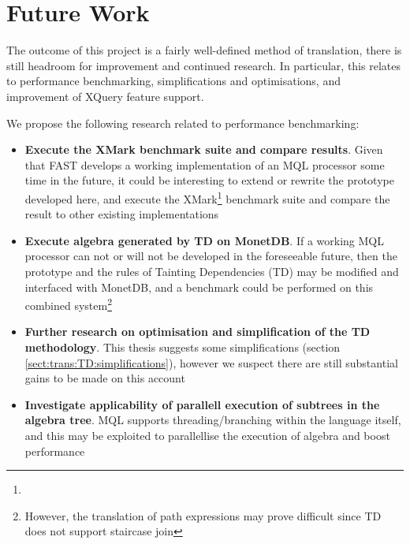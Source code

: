 \chapter{Future Work}
\label{chapter:future}

The outcome of this project is a fairly well-defined method of translation,
there is still headroom for improvement and continued research. In particular,
this relates to performance benchmarking, simplifications and optimisations,
and improvement of XQuery feature support.

We propose the following research related to performance benchmarking:
\begin{itemize}
  \item \textbf{Execute the XMark benchmark suite and compare results}. Given that FAST
  develops a working implementation of an MQL processor some time in the future, it could be interesting to extend or rewrite the
  prototype developed here, and execute the
  XMark\footnote{} 
  benchmark suite and compare the result to other existing implementations
  \item \textbf{Execute algebra generated by TD on MonetDB}. If a working MQL
  processor can not or will not be developed in the foreseeable future, then
  the prototype and the rules of Tainting Dependencies (TD) may be modified
  and interfaced with MonetDB, and a benchmark could be performed on this
  combined system\footnote{However, the translation of path expressions may
  prove difficult since TD does not support staircase join}
  \item \textbf{Further research on optimisation and simplification of the TD
  methodology}. This thesis suggests some simplifications (section
  \ref{sect:trans:TD:simplifications}), however we suspect there are still
  substantial gains to be made on this account
  \item \textbf{Investigate applicability of parallell execution of subtrees in the
  algebra tree}. MQL supports threading/branching within the language itself,
  and this may be exploited to parallellise the execution of algebra and boost
  performance
\end{itemize}

